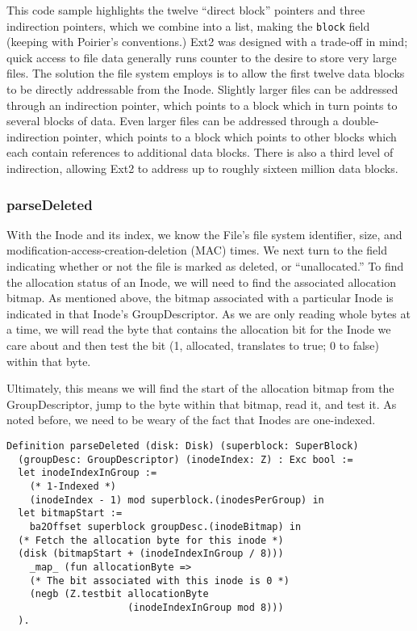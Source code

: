 \documentclass[nocopyrightspace]{sigplanconf}
\begin{document}
This code sample highlights the twelve ``direct block'' pointers and three
indirection pointers, which we combine into a list, making the {\tt block}
field (keeping with Poirier's conventions.) Ext2 was designed with a trade-off
in mind; quick access to file data generally runs counter to the desire to
store very large files.  The solution the file system employs is to allow the
first twelve data blocks to be directly addressable from the Inode. Slightly
larger files can be addressed through an indirection pointer, which points to
a block which in turn points to several blocks of data. Even larger files can
be addressed through a double-indirection pointer, which points to a block
which points to other blocks which each contain references to additional data
blocks. There is also a third level of indirection, allowing Ext2 to address
up to roughly sixteen million data blocks.

\subsubsection{parseDeleted}
With the Inode and its index, we know the File's file system identifier, size,
and modification-access-creation-deletion (MAC) times.  We next turn to the
field indicating whether or not the file is marked as deleted, or
``unallocated.'' To find the allocation status of an Inode, we will need to
find the associated allocation bitmap. As mentioned above, the bitmap
associated with a particular Inode is indicated in that Inode's
GroupDescriptor. As we are only reading whole bytes at a time, we will read
the byte that contains the allocation bit for the Inode we care about and then
test the bit (1, allocated, translates to true; 0 to false) within that byte.

Ultimately, this means we will find the start of the allocation bitmap from
the GroupDescriptor, jump to the byte within that bitmap, read it, and test
it. As noted before, we need to be weary of the fact that Inodes are
one-indexed.

\begin{lstlisting}
Definition parseDeleted (disk: Disk) (superblock: SuperBlock)
  (groupDesc: GroupDescriptor) (inodeIndex: Z) : Exc bool :=
  let inodeIndexInGroup := 
    (* 1-Indexed *)
    (inodeIndex - 1) mod superblock.(inodesPerGroup) in
  let bitmapStart := 
    ba2Offset superblock groupDesc.(inodeBitmap) in
  (* Fetch the allocation byte for this inode *)
  (disk (bitmapStart + (inodeIndexInGroup / 8))) 
    _map_ (fun allocationByte =>
    (* The bit associated with this inode is 0 *)
    (negb (Z.testbit allocationByte 
                     (inodeIndexInGroup mod 8)))
  ).
\end{lstlisting}
\end{document}
